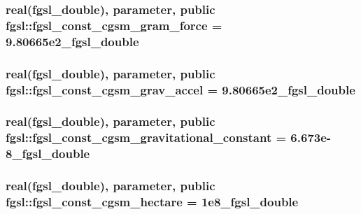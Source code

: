 \hypertarget{classfgsl_a1ba32b331b50764a4e448e8020526104}{
\subsubsection[{fgsl\-\_\-const\-\_\-cgsm\-\_\-gram\-\_\-force}]{\setlength{\rightskip}{0pt plus 5cm}real({\bf fgsl\-\_\-double}), parameter, public fgsl\-::fgsl\-\_\-const\-\_\-cgsm\-\_\-gram\-\_\-force = 9.\-80665e2\-\_\-fgsl\-\_\-double}}\label{classfgsl_a1ba32b331b50764a4e448e8020526104}
\hypertarget{classfgsl_abcdb6fe4c8e314d2d05ee14a854357fd}{
\subsubsection[{fgsl\-\_\-const\-\_\-cgsm\-\_\-grav\-\_\-accel}]{\setlength{\rightskip}{0pt plus 5cm}real({\bf fgsl\-\_\-double}), parameter, public fgsl\-::fgsl\-\_\-const\-\_\-cgsm\-\_\-grav\-\_\-accel = 9.\-80665e2\-\_\-fgsl\-\_\-double}}\label{classfgsl_abcdb6fe4c8e314d2d05ee14a854357fd}
\hypertarget{classfgsl_a9f255e9dfccd5852a1229344cadc48ba}{
\subsubsection[{fgsl\-\_\-const\-\_\-cgsm\-\_\-gravitational\-\_\-constant}]{\setlength{\rightskip}{0pt plus 5cm}real({\bf fgsl\-\_\-double}), parameter, public fgsl\-::fgsl\-\_\-const\-\_\-cgsm\-\_\-gravitational\-\_\-constant = 6.\-673e-\/8\-\_\-fgsl\-\_\-double}}\label{classfgsl_a9f255e9dfccd5852a1229344cadc48ba}
\hypertarget{classfgsl_a4d19d597ffc77fc0c1aa577276cab117}{
\subsubsection[{fgsl\-\_\-const\-\_\-cgsm\-\_\-hectare}]{\setlength{\rightskip}{0pt plus 5cm}real({\bf fgsl\-\_\-double}), parameter, public fgsl\-::fgsl\-\_\-const\-\_\-cgsm\-\_\-hectare = 1e8\-\_\-fgsl\-\_\-double}}\label{classfgsl_a4d19d597ffc77fc0c1aa577276cab117}

